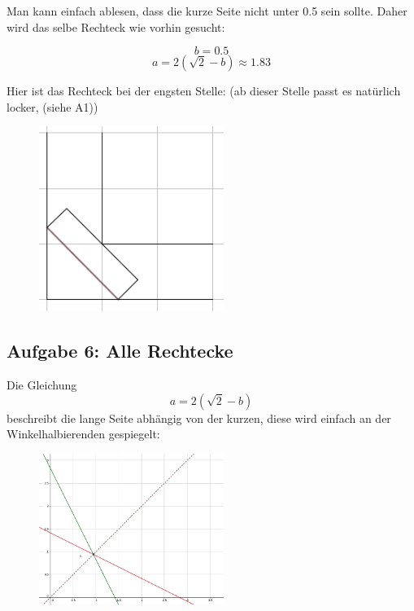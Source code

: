 \documentclass[a4paper,11pt]{article}
\begin{document}
Man kann einfach ablesen, dass die kurze Seite nicht unter 0.5 sein sollte. Daher wird das selbe Rechteck wie vorhin gesucht:

\[ b = 0.5 \]
\[ a = 2(\sqrt{2}-b) \approx 1.83 \]

Hier ist das Rechteck bei der engsten Stelle: (ab dieser Stelle passt es natürlich locker, (siehe A1))

\begin{figure}[H] 
        \centering
        \includegraphics[width=6cm]{img/A5_3.png}
\end{figure}

\subsection{Aufgabe 6: Alle Rechtecke}
Die Gleichung
\[ a = 2(\sqrt{2}-b) \]
beschreibt die lange Seite abhängig von der kurzen, diese wird einfach an der Winkelhalbierenden gespiegelt:
\begin{figure}[H] 
        \centering
        \includegraphics[width=6cm]{img/A6_1.png}
\end{figure}
\end{document}
